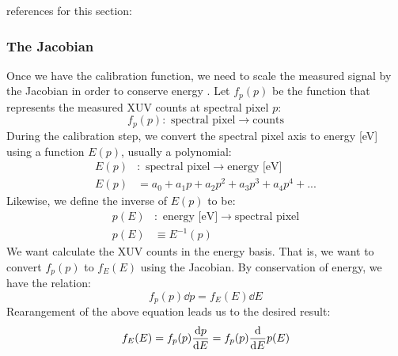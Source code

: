 references for this section: \cite{sorensenArgon3sAutoionization1994,caretteMulticonfigurationalHartreeFockClosecoupling2013}

\subsubsection{The Jacobian}
\label{sec:jacobian}

Once we have the calibration function, we need to scale the measured signal by the Jacobian in order to conserve energy \cite{mooneyGetBasicsRight2013}. Let $f_p(p)$ be the function that represents the measured XUV counts at spectral pixel $p$:
\begin{equation}
f_p(p): \textrm{ spectral pixel} \rightarrow \textrm{counts}
\end{equation}
During the calibration step, we convert the spectral pixel axis to energy [eV] using a function $E(p)$, usually a polynomial:
\begin{align}
E(p)&: \textrm{ spectral pixel} \rightarrow \textrm{energy [eV]} \\
E(p) &= a_0 + a_1 p + a_2 p^2 + a_3 p^3 + a_4 p^4 + ...
\end{align}
Likewise, we define the inverse of $E(p)$ to be:
\begin{align}
p(E)&: \textrm{ energy [eV]} \rightarrow \textrm{spectral pixel} \\
p(E) &\equiv E^{-1}(p)
\end{align}
We want calculate the XUV counts in the energy basis. That is, we want to convert $f_p(p)$ to $f_E(E)$ using the Jacobian. By conservation of energy, we have the relation:
\begin{equation}
f_p (p) \dd{p} = f_E (E) \dd{E}
\end{equation}
Rearangement of the above equation leads us to the desired result:
\begin{equation}
f_E (E) = f_p (p) \dv{p}{E} = f_p (p) \dv{E} p(E)
\end{equation}